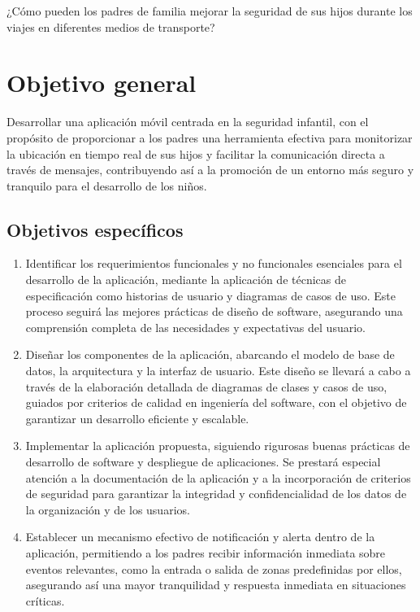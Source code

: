 \documentclass[12pt,onehalfspacing]{report}
\begin{document}
\begin{center}
¿Cómo pueden los padres de familia mejorar la seguridad de sus hijos durante los viajes en diferentes medios de transporte?
\end{center}

\section{Objetivo general}
Desarrollar una aplicación móvil centrada en la seguridad infantil, con el propósito de proporcionar a los padres una herramienta efectiva para monitorizar la ubicación en tiempo real de sus hijos y facilitar la comunicación directa a través de mensajes, contribuyendo así a la promoción de un entorno más seguro y tranquilo para el desarrollo de los niños.

\subsection{Objetivos específicos}
\begin{enumerate}
    \item Identificar los requerimientos funcionales y no funcionales esenciales para el desarrollo de la aplicación, mediante la aplicación de técnicas de especificación como historias de usuario y diagramas de casos de uso. Este proceso seguirá las mejores prácticas de diseño de software, asegurando una comprensión completa de las necesidades y expectativas del usuario.
    \item Diseñar los componentes de la aplicación, abarcando el modelo de base de datos, la arquitectura y la interfaz de usuario. Este diseño se llevará a cabo a través de la elaboración detallada de diagramas de clases y casos de uso, guiados por criterios de calidad en ingeniería del software, con el objetivo de garantizar un desarrollo eficiente y escalable.
    \item Implementar la aplicación propuesta, siguiendo rigurosas buenas prácticas de desarrollo de software y despliegue de aplicaciones. Se prestará especial atención a la documentación de la aplicación y a la incorporación de criterios de seguridad para garantizar la integridad y confidencialidad de los datos de la organización y de los usuarios.
    \item Establecer un mecanismo efectivo de notificación y alerta dentro de la aplicación, permitiendo a los padres recibir información inmediata sobre eventos relevantes, como la entrada o salida de zonas predefinidas por ellos, asegurando así una mayor tranquilidad y respuesta inmediata en situaciones críticas.
\end{enumerate}
\end{document}
